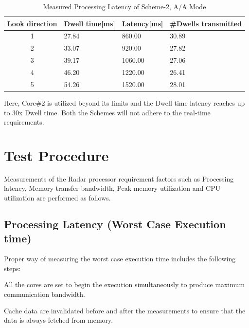 \begin{table}[h!]
	\centering
	\begin{tabular}{|c|l|l|l|} 
	 \hline
	 \textbf{Look direction} & \textbf{Dwell time[ms]} & \textbf{Latency[ms]} & \textbf{\#Dwells transmitted} \\
	 \hline
	 1 & 27.84 & 860.00 & 30.89 \\ \hline
	 2 & 33.07 & 920.00 & 27.82 \\ \hline
	 3 & 39.17 & 1060.00 & 27.06 \\ \hline
	 4 & 46.20 & 1220.00 & 26.41 \\ \hline
	 5 & 54.26 & 1520.00 & 28.01 \\ \hline
	\end{tabular}
	\caption{Measured Processing Latency of Scheme-2, A/A Mode}
	\label{tbl:mm:scheme2_true_latency}
\end{table}
\FloatBarrier
Here, Core\#2 is utilized beyond its limits and the Dwell time latency reaches up to 30x Dwell time. Both the Schemes will not adhere to the real-time requirements.

\section{Test Procedure} 
\label{sec:mm:test_procedure}
Measurements of the Radar processor requirement factors such as Processing latency, Memory transfer bandwidth, Peak memory utilization and CPU utilization are performed as follows.

\subsection{Processing Latency (Worst Case Execution time)}
\label{ss:mm:latency}
Proper way of measuring the worst case execution time includes the following steps:
\begin{compactitem} 
	\item All the cores are set to begin the execution simultaneously to produce maximum communication bandwidth.
	\item Cache data are invalidated before and after the measurements to ensure that the data is always fetched from memory.
\end{compactitem} 

